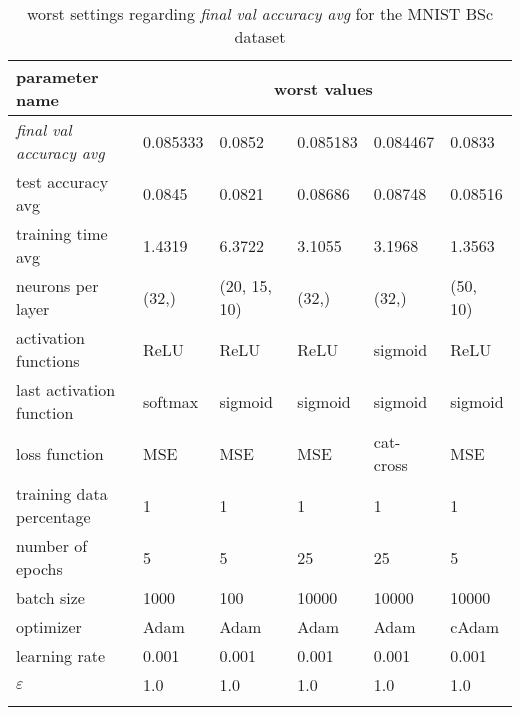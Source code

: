 \begin{longtable}{|l|l|l|l|l|>{\columncolor{worstColumnColor}}l|}
\hline
\textbf{parameter name} & \multicolumn{5}{c|}{\textbf{worst values}} \\
\hline
\textit{final val accuracy avg} & 0.085333 &  0.0852 & 0.085183 & 0.084467 &  0.0833 \\
test accuracy avg        & 0.0845  & 0.0821  & 0.08686 & 0.08748 & 0.08516 \\
training time avg        & 1.4319  & 6.3722  & 3.1055  & 3.1968  & 1.3563  \\
neurons per layer        & (32,)   & (20, 15, 10) & (32,)   & (32,)   & (50, 10) \\
activation functions     & ReLU    & ReLU    & ReLU    & sigmoid & ReLU    \\
last activation function & softmax & sigmoid & sigmoid & sigmoid & sigmoid \\
loss function            & MSE     & MSE     & MSE     & cat-cross & MSE     \\
{\color{equalParamColor} training data percentage } & {\color{equalParamColor} 1 } & {\color{equalParamColor} 1 } & {\color{equalParamColor} 1 } & {\color{equalParamColor} 1 } & {\color{equalParamColor} 1 } \\
number of epochs         & 5       & 5       & 25      & 25      & 5       \\
batch size               & 1000    & 100     & 10000   & 10000   & 10000   \\
optimizer                & Adam    & Adam    & Adam    & Adam    & cAdam   \\
{\color{equalParamColor} learning rate } & {\color{equalParamColor} 0.001 } & {\color{equalParamColor} 0.001 } & {\color{equalParamColor} 0.001 } & {\color{equalParamColor} 0.001 } & {\color{equalParamColor} 0.001 } \\
{\color{equalParamColor} $\varepsilon$ } & {\color{equalParamColor} 1.0 } & {\color{equalParamColor} 1.0 } & {\color{equalParamColor} 1.0 } & {\color{equalParamColor} 1.0 } & {\color{equalParamColor} 1.0 } \\
\hline

\caption{worst settings regarding \textit{final val accuracy avg} for the MNIST BSc dataset}
\label{table:final_val_accuracy_avg_worst_mnist_bsc}
\end{longtable}
